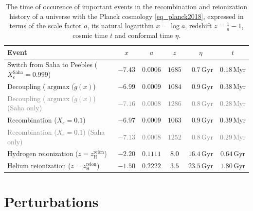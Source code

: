 \documentclass[10pt,a4paper]{article}
\DeclareMathOperator{\argmax}{argmax}
\begin{document}
\newcommand\gray[1]{\textcolor{gray}{#1}}
\begin{table}[b]
\centering
\caption{%
	The time of occurence of important events in the recombination and reionization history of a universe with the Planck cosmology \eqref{eq_planck2018},
	expressed in terms of the scale factor $a$, its natural logarithm $x = \log a$, redshift $z = \frac1a - 1$, cosmic time $t$ and conformal time $\eta$.
}
\label{table_times2}
\begin{tabular}{l c c c c c}
	\toprule
	Event                                                               & $x$     & $a$       & $z$    & $\eta$    & $t$ \\
	\midrule
	Switch from Saha to Peebles ($X_e^\text{Saha} = 0.999$) & $-7.43$ & $0.0006$  & $1685$ & $\phantom{0}0.7\,\mathrm{Gyr}$ & $0.18\,\mathrm{Myr}$ \\
	Decoupling ($\argmax(\tilde{g}(x)$)                     & $-6.99$ & $0.0009$  & $1084$ & $\phantom{0}0.9\,\mathrm{Gyr}$ & $0.38\,\mathrm{Myr}$ \\
	\gray{Decoupling ($\argmax(\tilde{g}(x)$) (Saha only)}         & \gray{$-7.16$} & \gray{$0.0008$}  & \gray{$1286$} & \gray{$\phantom{0}0.8\,\mathrm{Gyr}$} & \gray{$0.28\,\mathrm{Myr}$} \\
	Recombination ($X_e = 0.1$)                             & $-6.97$ & $0.0009$  & $1063$ & $\phantom{0}0.9\,\mathrm{Gyr}$ & $0.39\,\mathrm{Myr}$ \\
	\gray{Recombination ($X_e = 0.1$) (Saha only)}                 & \gray{$-7.13$} & \gray{$0.0008$}  & \gray{$1252$} & \gray{$\phantom{0}0.8\,\mathrm{Gyr}$} & \gray{$0.29\,\mathrm{Myr}$} \\
	Hydrogen reionization ($z = z^\text{reion}_\text{H}$)   & $-2.20$ & $0.1111$  & $8.0$  & $16.4\,\mathrm{Gyr}$ & $0.64\,\mathrm{Gyr}$ \\
	Helium reionization ($z = z^\text{reion}_\text{H}$)     & $-1.50$ & $0.2222$  & $3.5$  & $23.5\,\mathrm{Gyr}$ & $1.80\,\mathrm{Gyr}$ \\
	\bottomrule
\end{tabular}
\end{table}



\clearpage
\section{Perturbations}
\label{sec_perturbations}

\newcommand\N{\mathcal{N}}
\newcommand\aH{\mathcal{H}}
\end{document}
